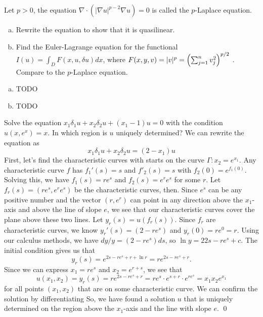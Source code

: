 \documentclass{article}
\newcommand{\D}{\nabla}
\renewcommand{\d}{\delta}
\begin{document}
\newpage
{} Let $p > 0$, the equation $\D \cdot (|\D u|^{p-2}\D u) = 0$ is called the $p$-Laplace equation.
\begin{enumerate}[(a)]
    \item Rewrite the equation to show that it is quasilinear.
    \item Find the Euler-Lagrange equation for the functional $I(u) = \int_D F (x, u, \d u)dx$, where
    $F (x, y, v) = |v|^p =
    \del{\sum^n
    _{j=1} v^2_j
    }^{p/2}$
    . Compare to the $p$-Laplace equation.
\end{enumerate}\tri
\hop
\solution
\begin{enumerate}[(a)]
    \item TODO
    \item TODO
\end{enumerate}


\newpage
{} Solve the equation $x_1\d_1u+x_2\d_2u+(x_1-1)u = 0$ with the condition $u(x, e^x) = x$.
In which region is $u$ uniquely determined?\tri
\hop
\solution We can rewrite the equation as 
\[x_1\d_1u+x_2\d_2u=(2-x_1)u\]
First, let's find the characteristic curves with starts on the curve $\Gamma: x_2 = e^{x_1}$. Any characteristic curve $f$ has $f_1'(s) = s$ and $f'_2(s) = s$ with $f_2(0)=e^{f_1(0)}$. 
\hop 
Solving this, we have $f_1(s) = re^s$ and $f_2(s) = e^re^s$ for some $r$. Let $f_r(s) = (re^s, e^re^s)$ be the characteristic curves, then. Since $e^s$ can be any positive number and the vector $(r,e^r)$ can point in any direction above the $x_1$-axis and above the line of slope $e$, we see that our characteristic curves cover the plane above these two lines.
\hop %
Let $y_r(s) = u(f_r(s))$. Since $f_r$ are characteristic curves, we know $y_r'(s)=(2-re^s)$ and $y_r(0)=re^0 = r$. Using our calculus methods, we have $dy/y = (2-re^s)ds$, so $\ln y = 22s-re^s+c$. The initial condition gives us that  
\[y_r(s)=e^{2s-re^s+r+\ln r}=re^{2s-re^s+r}.\]
Since we can express $x_1 = re^s$ and $x_2 = e^{r+s}$, we see that 
\[u(x_1,x_2) = y_r(s) = re^{2s-re^s+r} = re^s \cdot e^{s+r}\cdot e^{re^s} = x_1x_2e^{x_1}\]
for all points $(x_1, x_2)$ that are on some characteristic curve. We can confirm the solution by differentiating So, we have found a solution $u$ that is uniquely determined on the region above the $x_1$-axis and the line with slope $e$. \qed
\end{document}

